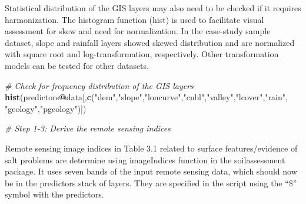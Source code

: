 \documentclass[
  10pt,
  b5paper,
]{book}
\newenvironment{Shaded}{\begin{snugshade}}{\end{snugshade}}
\newcommand{\CommentTok}[1]{\textcolor[rgb]{0.56,0.35,0.01}{\textit{#1}}}
\newcommand{\KeywordTok}[1]{\textcolor[rgb]{0.13,0.29,0.53}{\textbf{#1}}}
\newcommand{\NormalTok}[1]{#1}
\newcommand{\OperatorTok}[1]{\textcolor[rgb]{0.81,0.36,0.00}{\textbf{#1}}}
\newcommand{\StringTok}[1]{\textcolor[rgb]{0.31,0.60,0.02}{#1}}
\begin{document}
\begin{Shaded}
\end{Shaded}

Statistical distribution of the GIS layers may also need to be checked if it requires harmonization. The histogram function (hist) is used to facilitate visual assessment for skew and need for normalization. In the case-study sample dataset, slope and rainfall layers showed skewed distribution and are normalized with square root and log-transformation, respectively. Other transformation models can be tested for other datasets.

\begin{Shaded}
\begin{Highlighting}[]
\CommentTok{# Check for frequency distribution of the GIS layers}
\KeywordTok{hist}\NormalTok{(predictors}\OperatorTok{@}\NormalTok{data[,}\KeywordTok{c}\NormalTok{(}\StringTok{"dem"}\NormalTok{,}\StringTok{"slope"}\NormalTok{,}\StringTok{"loncurve"}\NormalTok{,}\StringTok{"cnbl"}\NormalTok{,}\StringTok{"valley"}\NormalTok{,}\StringTok{"lcover"}\NormalTok{,}\StringTok{"rain"}\NormalTok{, }\StringTok{"geology"}\NormalTok{,}\StringTok{"pgeology"}\NormalTok{)])}


\CommentTok{# Step 1-3: Derive the remote sensing indices}
\end{Highlighting}
\end{Shaded}

Remote sensing image indices in Table 3.1 related to surface features/evidence of salt problems are determine using imageIndices function in the soilassessment package. It uses seven bands of the input remote sensing data, which should now be in the predictors stack of layers. They are specified in the script using the ``\$'' symbol with the predictors.
\end{document}
